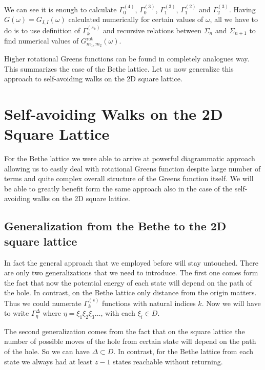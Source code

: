 \documentclass{article}
\begin{document}
We can see it is enough to calculate $\Gamma_0^{(4)}$, $\Gamma_0^{(3)}$, $\Gamma_1^{(3)}$, $\Gamma_1^{(2)}$ and $\Gamma_2^{(3)}$. Having $G(\omega) = G_{I,I}(\omega)$ calculated numerically for certain values of $\omega$, all we have to do is to use definition of $\Gamma_k^{(s_k)}$ and recursive relations between $\Sigma_n$ and $\Sigma_{n+1}$ to find numerical values of $G^{\text{rot}}_{m_1,m_2}(\omega)$.

Higher rotational Greens functions can be found in completely analogues way. This summarizes the case of the Bethe lattice. Let us now generalize this approach to self-avoiding walks on the 2D square lattice.

\section{Self-avoiding Walks on the 2D Square Lattice}
For the Bethe lattice we were able to arrive at powerful diagrammatic approach allowing us to easily deal with rotational Greens function despite large number of terms and quite complex overall structure of the Greens function itself. We will be able to greatly benefit form the same approach also in the case of the self-avoiding walks on the 2D square lattice. 

\subsection{Generalization from the Bethe to the 2D square lattice}
In fact the general approach that we employed before will stay untouched. There are only two generalizations that we need to introduce. The first one comes form the fact that now the potential energy of each state will depend on the path of the hole. In contrast, on the Bethe lattice only distance from the origin matters. Thus we could numerate $\Gamma_k^{(s)}$ functions with natural indices $k$. Now we will have to write $\Gamma_{\eta}^{\Delta}$ where $\eta = \xi_1 \xi_2 \xi_3 \hdots$, with each $\xi_i \in D$. 

The second generalization comes from the fact that on the square lattice the number of possible moves of the hole from certain state will depend on the path of the hole. So we can have $\Delta \subset D$. In contrast, for the Bethe lattice from each state we always had at least $z-1$ states reachable without returning.
\end{document}
